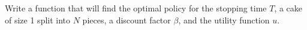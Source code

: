 \begin{problem}
Write a function  that will find the optimal policy for the stopping time $T$, a cake of size 1 split into $N$ pieces, a discount factor $\beta$, and the utility function $u$.



\end{problem}







